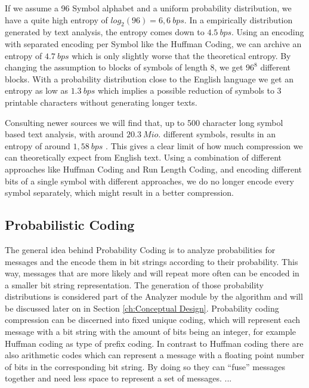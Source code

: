 \par {
If we assume a 96 Symbol alphabet and a uniform probability distribution, we have a quite high entropy of $log_2 (96) = 6,6 \: bps$. In a empirically distribution generated by text analysis, the entropy comes down to $4.5 \: bps$. Using an encoding with separated encoding per Symbol like the Huffman Coding, we can archive an entropy of $4.7 \: bps$ which is only slightly worse that the theoretical entropy. By changing the assumption to blocks of symbols of length 8, we get $96^8$ different blocks. With a probability distribution close to the English language we get an entropy as low as $1.3 \: bps$ which implies a possible reduction of symbols to 3 printable characters without generating longer texts.}

\par{
Consulting newer sources we will find that, up to 500 character long symbol based text analysis, with around $20.3 \: Mio.$ different symbols, results in an entropy of around $1,58 \: bps$ \cite{entropy-new}. This gives a clear limit of how much compression we can theoretically expect from English text.  Using a combination of different approaches like Huffman Coding and Run Length Coding, and encoding different bits of a single symbol with different approaches, we do no longer encode every symbol separately, which might result in a better compression.}


\subsection{Probabilistic Coding}
\par{
The general idea behind Probability Coding is to analyze probabilities for messages and the encode them in bit strings according to their probability. This way, messages that are more likely and will repeat more often can be encoded in a smaller bit string representation. The generation of those probability distributions is considered part of the Analyzer module by the algorithm and will be discussed later on in Section \ref{ch:Conceptual Design}. Probability coding compression can be discerned into fixed unique coding, which will represent each message with a bit string with the amount of bits being an integer, for example Huffman coding as type of prefix coding. In contrast to Huffman coding there are also arithmetic codes which can represent a message with a floating point number of bits in the corresponding bit string. By doing so they can \enquote{fuse} messages together and need less space to represent a set of messages.
}
...


